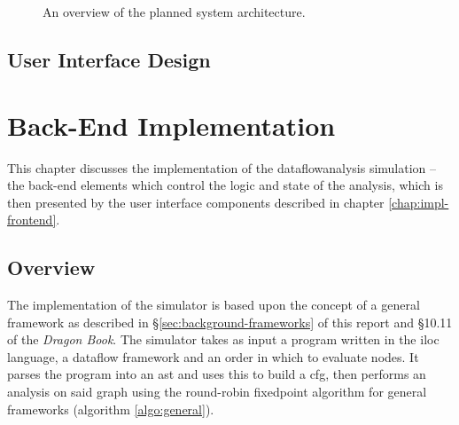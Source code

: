 \documentclass[bsc,twoside,singlespacing,parskip,logo,notimes,normalheadings]{infthesis}
\begin{document}
\begin{figure}[!ht]
{
      }
      \captionsetup{justification=centering}
      \caption{An overview of the planned system architecture.}\label{fig:sysarch}
    \end{figure}


    \section{User Interface Design}\label{sec:design-interface}

    

\chapter{Back-End Implementation}\label{chap:impl-backend}
This chapter discusses the implementation of the
\gls{dataflowanalysis} simulation -- the back-end elements which
control the logic and state of the analysis, which is then presented
by the user interface components described in chapter
\ref{chap:impl-frontend}.

    \section{Overview}
    The implementation of the simulator is based upon the concept of a
    general framework as described in
    \S\ref{sec:background-frameworks} of this report and \S10.11 of
    the {\em Dragon Book}\cite{dragonbook}. The simulator takes as
    input a program written in the \gls{iloc} language, a
    \gls{dataflow} framework and an order in which to evaluate
    nodes. It parses the program into an \gls{ast} and uses this to
    build a \gls{cfg}, then performs an analysis on said graph using
    the round-robin \gls{fixedpoint} algorithm for general frameworks
    (algorithm \ref{algo:general}).
\end{document}
